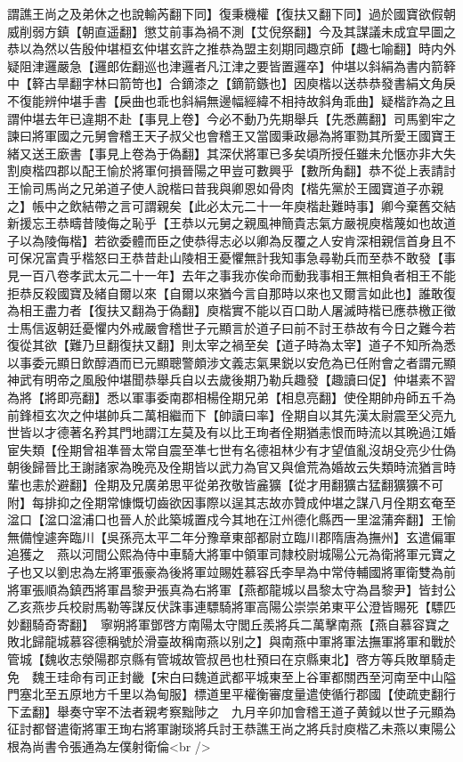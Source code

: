 謂譙王尚之及弟休之也說輸芮翻下同】復秉機權【復扶又翻下同】過於國寶欲假朝威削弱方鎮【朝直遥翻】懲艾前事為禍不測【艾倪祭翻】今及其謀議未成宜早圖之恭以為然以告殷仲堪桓玄仲堪玄許之推恭為盟主刻期同趣京師【趣七喻翻】時内外疑阻津邏嚴急【邏郎佐翻巡也津邏者凡江津之要皆置邏卒】仲堪以斜絹為書内箭簳中【簳古旱翻字林曰箭笴也】合鏑漆之【鏑箭鏃也】因庾楷以送恭恭發書絹文角戾不復能辨仲堪手書【戾曲也乖也斜絹無邊幅經緯不相持故斜角乖曲】疑楷詐為之且謂仲堪去年已違期不赴【事見上卷】今必不動乃先期舉兵【先悉薦翻】司馬劉牢之諫曰將軍國之元舅會稽王天子叔父也會稽王又當國秉政曏為將軍勠其所愛王國寶王緒又送王廞書【事見上卷為于偽翻】其深伏將軍已多矣頃所授任雖未允愜亦非大失割庾楷四郡以配王愉於將軍何損晉陽之甲豈可數興乎【數所角翻】恭不從上表請討王愉司馬尚之兄弟道子使人說楷曰昔我與卿恩如骨肉【楷先黨於王國寶道子亦親之】帳中之飲結帶之言可謂親矣【此必太元二十一年庾楷赴難時事】卿今棄舊交結新援忘王恭疇昔陵侮之恥乎【王恭以元舅之親風神簡貴志氣方嚴視庾楷蔑如也故道子以為陵侮楷】若欲委體而臣之使恭得志必以卿為反覆之人安肯深相親信首身且不可保况富貴乎楷怒曰王恭昔赴山陵相王憂懼無計我知事急尋勒兵而至恭不敢發【事見一百八卷孝武太元二十一年】去年之事我亦俟命而動我事相王無相負者相王不能拒恭反殺國寶及緒自爾以來【自爾以來猶今言自那時以來也又爾言如此也】誰敢復為相王盡力者【復扶又翻為于偽翻】庾楷實不能以百口助人屠滅時楷已應恭檄正徵士馬信返朝廷憂懼内外戒嚴會稽世子元顯言於道子曰前不討王恭故有今日之難今若復從其欲【難乃旦翻復扶又翻】則太宰之禍至矣【道子時為太宰】道子不知所為悉以事委元顯日飲醇酒而已元顯聰警頗涉文義志氣果鋭以安危為已任附會之者謂元顯神武有明帝之風殷仲堪聞恭舉兵自以去歲後期乃勒兵趣發【趣讀曰促】仲堪素不習為將【將即亮翻】悉以軍事委南郡相楊佺期兄弟【相息亮翻】使佺期帥舟師五千為前鋒桓玄次之仲堪帥兵二萬相繼而下【帥讀曰率】佺期自以其先漢太尉震至父亮九世皆以才德著名矜其門地謂江左莫及有以比王珣者佺期猶恚恨而時流以其晩過江婚宦失類【佺期曾祖凖晉太常自震至凖七世有名德祖林少有才望值亂沒胡殳亮少仕偽朝後歸晉比王謝諸家為晚亮及佺期皆以武力為官又與傖荒為婚故云失類時流猶言時輩也恚於避翻】佺期及兄廣弟思平從弟孜敬皆麄獷【從才用翻獷古猛翻獷獷不可附】每排抑之佺期常慷慨切齒欲因事際以逞其志故亦贊成仲堪之謀八月佺期玄奄至湓口【湓口湓浦口也晉人於此築城置戍今其地在江州德化縣西一里湓蒲奔翻】王愉無備惶遽奔臨川【吳孫亮太平二年分豫章東部都尉立臨川郡隋唐為撫州】玄遣偏軍追獲之　燕以河間公熙為侍中車騎大將軍中領軍司隸校尉城陽公元為衛將軍元寶之子也又以劉忠為左將軍張豪為後將軍竝賜姓慕容氏李旱為中常侍輔國將軍衛雙為前將軍張順為鎮西將軍昌黎尹張真為右將軍【燕都龍城以昌黎太守為昌黎尹】皆封公　乙亥燕步兵校尉馬勒等謀反伏誅事連驃騎將軍高陽公崇崇弟東平公澄皆賜死【驃匹妙翻騎奇寄翻】　寧朔將軍鄧啓方南陽太守閭丘羨將兵二萬擊南燕【燕自慕容寶之敗北歸龍城慕容德稱號於滑臺故稱南燕以别之】與南燕中軍將軍法撫軍將軍和戰於管城【魏收志滎陽郡京縣有管城故管叔邑也杜預曰在京縣東北】啓方等兵敗單騎走免　魏王珪命有司正封畿【宋白曰魏道武都平城東至上谷軍都關西至河南至中山隘門塞北至五原地方千里以為甸服】標道里平權衡審度量遣使循行郡國【使疏吏翻行下孟翻】舉奏守宰不法者親考察黜陟之　九月辛卯加會稽王道子黄鉞以世子元顯為征討都督遣衛將軍王珣右將軍謝琰將兵討王恭譙王尚之將兵討庾楷乙未燕以東陽公根為尚書令張通為左僕射衛倫<br />
